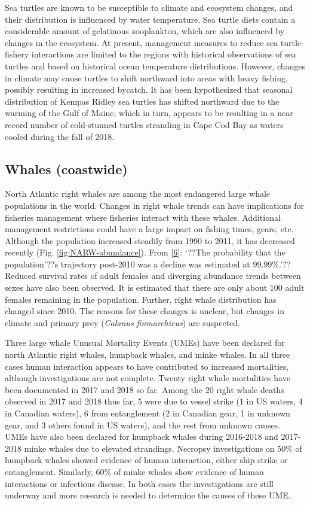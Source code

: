 \documentclass[10pt,]{article}
\begin{document}
Sea turtles are known to be susceptible to climate and ecosystem
changes, and their distribution is influenced by water temperature. Sea
turtle diets contain a considerable amount of gelatinous zooplankton,
which are also influenced by changes in the ecosystem. At present,
management measures to reduce sea turtle-fishery interactions are
limited to the regions with historical observations of sea turtles and
based on historical ocean temperature distributions. However, changes in
climate may cause turtles to shift northward into areas with heavy
fishing, possibly resulting in increased bycatch. It has been
hypothesized that seasonal distribution of Kempas Ridley sea turtles has
shifted northward due to the warming of the Gulf of Maine, which in
turn, appears to be resulting in a near record number of cold-stunned
turtles stranding in Cape Cod Bay as waters cooled during the fall of
2018.

\subsection{Whales (coastwide)}\label{whales-coastwide}

North Atlantic right whales are among the most endangered large whale
populations in the world. Changes in right whale trends can have
implications for fisheries management where fisheries interact with
these whales. Additional management restrictions could have a large
impact on fishing times, gears, etc. Although the population increased
steadily from 1990 to 2011, it has decreased recently (Fig.
\ref{fig:NARW-abundance}). From
{[}\protect\hyperlink{ref-pace_statespace_2017}{6}{]}: `??The
probability that the population'??s trajectory post-2010 was a decline
was estimated at 99.99\%.'?? Reduced survival rates of adult females and
diverging abundance trends between sexes have also been observed. It is
estimated that there are only about 100 adult females remaining in the
population. Further, right whale distribution has changed since 2010.
The reasons for these changes is unclear, but changes in climate and
primary prey (\emph{Calanus finmarchicus}) are suspected.

Three large whale Unusual Mortality Events (UMEs) have been declared for
north Atlantic right whales, humpback whales, and minke whales. In all
three cases human interaction appears to have contributed to increased
mortalities, although investigations are not complete. Twenty right
whale mortalities have been documented in 2017 and 2018 so far. Among
the 20 right whale deaths observed in 2017 and 2018 thus far, 5 were due
to vessel strike (1 in US waters, 4 in Canadian waters), 6 from
entanglement (2 in Canadian gear, 1 in unknown gear, and 3 others found
in US waters), and the rest from unknown causes. UMEs have also been
declared for humpback whales during 2016-2018 and 2017-2018 minke whales
due to elevated strandings. Necropsy investigations on 50\% of humpback
whales showed evidence of human interaction, either ship strike or
entanglement. Similarly, 60\% of minke whales show evidence of human
interactions or infectious disease. In both cases the investigations are
still underway and more research is needed to determine the causes of
these UME.
\end{document}
